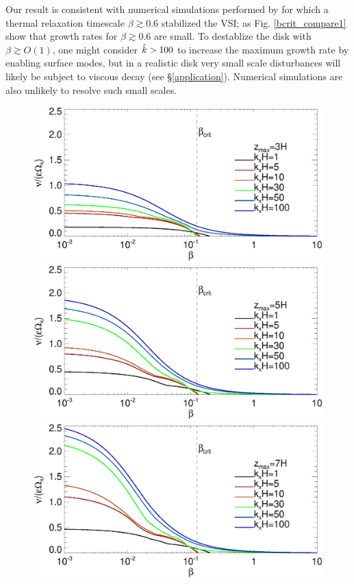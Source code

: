 Our result is consistent with numerical simulations performed by
\cite{nelson13} for which a thermal relaxation timescale $\beta\gtrsim
0.6$ stabilized the VSI; as Fig. \ref{bcrit_compare1} show that growth
rates for $\beta\gtrsim 0.6$ are small. To destablize the disk with
$\beta\gtrsim O(1)$, one might consider 
$\hat{k} > 100$ to increase the maximum growth rate by enabling surface
modes, but in a realistic disk
very small scale disturbances will likely be subject to viscous decay
(see \S\ref{application}). Numerical simulations are also unlikely to
resolve such small scales.  

\begin{figure}
  \includegraphics[width=\linewidth,clip=true,trim=0cm 1.75cm 0cm 0.9cm]{figures/gcorr_compare_iso_maxrate_z3}
  \includegraphics[width=\linewidth,clip=true,trim=0cm 1.75cm 0cm 0.9cm]{figures/gcorr_compare_iso_maxrate_z5}
  \includegraphics[width=\linewidth,clip=true,trim=0cm 0.0cm 0cm 0.9cm]{figures/gcorr_compare_iso_maxrate_z7} 

\end{figure}
